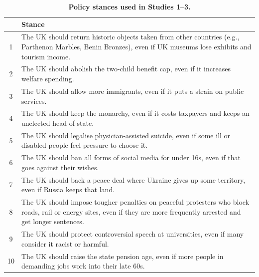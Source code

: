 \begin{table}[!htbp]
\centering
\small
\caption{\textbf{Policy stances used in Studies 1--3.}}
\label{tab:issues}

\renewcommand{\arraystretch}{1.35}
\setlength{\tabcolsep}{4pt}

\begin{tabular}{@{} c p{} @{}}
\toprule
& \textbf{Stance} \\
\midrule
\rowcolor{gray!6}
1 & The UK should return historic objects taken from other countries (e.g., Parthenon Marbles, Benin Bronzes), even if UK museums lose exhibits and tourism income. \\
2 & The UK should abolish the two-child benefit cap, even if it increases welfare spending. \\
\rowcolor{gray!6}
3 & The UK should allow more immigrants, even if it puts a strain on public services. \\
4 & The UK should keep the monarchy, even if it costs taxpayers and keeps an unelected head of state. \\
\rowcolor{gray!6}
5 & The UK should legalise physician-assisted suicide, even if some ill or disabled people feel pressure to choose it. \\
6 & The UK should ban all forms of social media for under 16s, even if that goes against their wishes. \\
\rowcolor{gray!6}
7 & The UK should back a peace deal where Ukraine gives up some territory, even if Russia keeps that land. \\
8 & The UK should impose tougher penalties on peaceful protesters who block roads, rail or energy sites, even if they are more frequently arrested and get longer sentences. \\
\rowcolor{gray!6}
9 & The UK should protect controversial speech at universities, even if many consider it racist or harmful. \\
10 & The UK should raise the state pension age, even if more people in demanding jobs work into their late 60s. \\
\bottomrule
\end{tabular}

\end{table}

